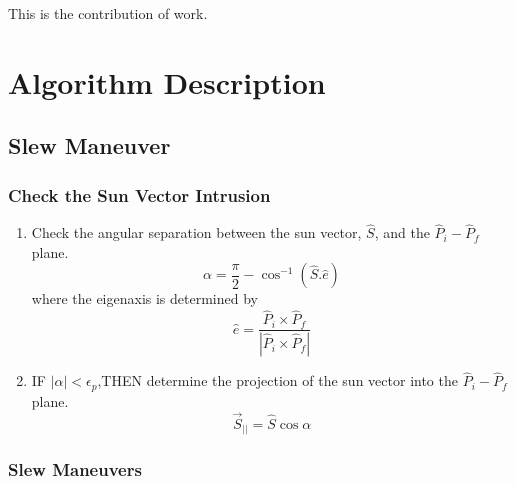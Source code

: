 \documentclass[letterpaper, preprint, paper,11pt]{AAS}	%
\begin{document}
	This is the contribution of work. 
	
	\section{Algorithm Description} 
	
	\subsection{Slew Maneuver} 
	
	\subsubsection{Check the Sun Vector Intrusion}
	\begin{enumerate}
		\item Check the angular separation between the sun vector, $\hat{S}$, and the $\hat{P}_i-\hat{P}_f$ plane.
		\begin{equation}
		\alpha=\frac{\pi}{2}-\cos^{-1}(\hat{S}.\hat{e})
		\end{equation}
		where the eigenaxis is determined by
		\begin{equation}\label{eaxis}
		\hat{e}=\frac{\hat{P}_i\times\hat{P}_f}{|\hat{P}_i\times \hat{P}_f|}
		\end{equation} 
		
		\item IF $|\alpha|<\epsilon_p$,THEN determine the projection of the sun vector into the $\hat{P}_i-\hat{P}_f$ plane.
		\begin{equation}\label{Sbar}
		\vec{S}_{||}=\hat{S}\cos\alpha
		\end{equation}
	\end{enumerate}
	
	\subsubsection{Slew Maneuvers}
	
\end{document}
